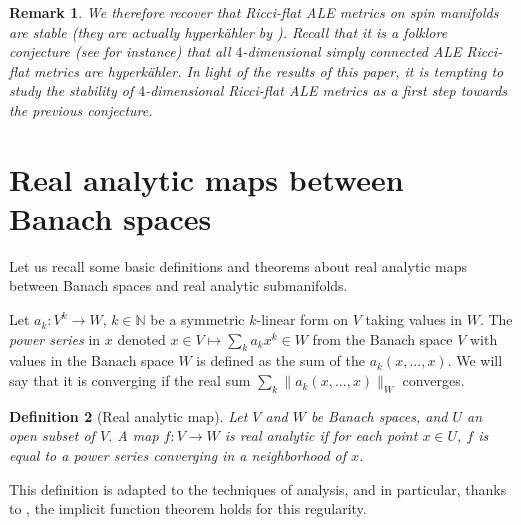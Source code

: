\documentclass[a4paper,11pt,reqno]{amsart}
\newtheorem{defn}{Definition}[section]
\newtheorem{rk}[defn]{Remark}
\numberwithin{equation}{section}
\begin{document}
	
	\begin{rk}
		We therefore recover that Ricci-flat ALE metrics on spin manifolds are \emph{stable} (they are actually hyperkähler by \cite{nak}). Recall that it is a folklore conjecture (see \cite[Section $1$, $3)$]{Ban-Kas-Nak} for instance) that all $4$-dimensional simply connected ALE Ricci-flat metrics are hyperk\"ahler. In light of the results of this paper, it is tempting to study the stability of $4$-dimensional Ricci-flat ALE metrics as a first step towards the previous conjecture.	
		\end{rk}
	
	\newpage
	\appendix
	
	
	\section{Real analytic maps between Banach spaces}\label{app-A}
	
	
	Let us recall some basic definitions and theorems about real analytic maps between Banach spaces and real analytic submanifolds.
	
	Let $ a_k : V^k\to W$, $k\in \mathbb{N}$ be a symmetric $k$-linear form on $V$ taking values in $W$. The \emph{power series} in $x$ denoted $x\in V \mapsto\sum_k a_k x^k\in W$ from the Banach space $V$ with values in the Banach space $W$ is defined as the sum of the $a_k(x,...,x)$. We will say that it is converging if the real sum $\sum_k \|a_k(x,...,x)\|_{W}$ converges.
	
	\begin{defn}[Real analytic map]\label{def-analytic}
		Let $V$ and $W$ be Banach spaces, and $U$ an open subset of $V$. A map $f: V\to W$ is \emph{real analytic} if for each point $x\in U$, $f$ is equal to a power series converging in a neighborhood of $x$.
	\end{defn}
	
	This definition is adapted to the techniques of analysis, and in particular, thanks to \cite[Implicit Function Theorem, p. 1081]{Whi-Ana-Fct}, the implicit function theorem holds for this regularity. 
	
\end{document}
